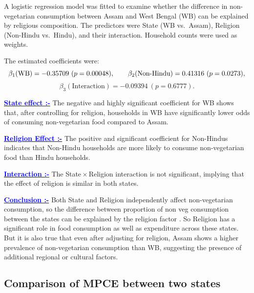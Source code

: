 A logistic regression model was fitted to examine whether the difference in
non-vegetarian consumption between Assam and West Bengal (WB) can be explained
by religious composition. The predictors were State (WB vs.\ Assam), Religion
(Non-Hindu vs.\ Hindu), and their interaction. Household counts were used as
weights.

The estimated coefficients were:
\[
\beta_1(\text{WB}) = -0.35709 \ (p = 0.00048), \qquad
\beta_2(\text{Non\mbox{-}Hindu}) = 0.41316 \ (p = 0.0273),
\]
\[
\beta_3(\text{Interaction}) = -0.09394 \ (p = 0.6777).
\]

\underline{\textbf{\textcolor{blue}{State effect :-}}} The negative and highly significant coefficient for WB
shows that, after controlling for religion, households in WB have
significantly lower odds of consuming non-vegetarian food compared to Assam.

\underline{\textbf{\textcolor{blue}{Religion Effect :-}}} The positive and significant coefficient for
Non-Hindus indicates that Non-Hindu households are more likely to consume
non-vegetarian food than Hindu households.

\underline{\textbf{\textcolor{blue}{Interaction :-}}} The State\,\(\times\)\,Religion interaction is not
significant, implying that the effect of religion is similar in both states.

\underline{\textbf{\textcolor{blue}{Conclusion :-}}} Both State and Religion independently affect
non-vegetarian consumption, so the difference between proportion of non veg consumption between the states can be
explained by the religion factor . So Religion has a significant role in food consumption as well as expenditure across these states.  But it is also true that even after adjusting for religion, Assam shows a higher prevalence of non-vegetarian consumption than WB, suggesting the
presence of additional regional or cultural factors.

\vspace{2 mm}
\subsection{\textbf{\textcolor{deepgreen}{\large{Comparison of MPCE between two states}}}}

